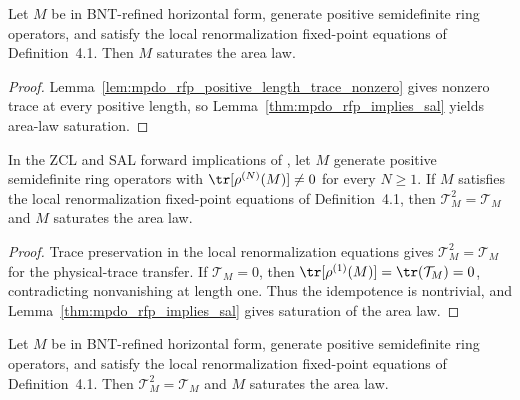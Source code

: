 \begin{corollary}
    \label{cor:mpdo_horizontal_rfp_implies_sal}
    \leanok
    Let $M$ be in BNT-refined horizontal form, generate positive
    semidefinite ring operators, and satisfy the local renormalization
    fixed-point equations of Definition~4.1. Then $M$ saturates the area law.
\end{corollary}

\begin{proof}\leanok
    Lemma~\ref{lem:mpdo_rfp_positive_length_trace_nonzero} gives nonzero trace
    at every positive length, so
    Lemma~\ref{thm:mpdo_rfp_implies_sal} yields area-law saturation.
\end{proof}

\begin{lemma}
    \label{thm:mpdo_rfp_implies_zcl_and_sal}
    \leanok
    In the ZCL and SAL forward implications of
    \cite[Appendix~C, lines~1333--1341]{Cirac2016MPDO_arXiv}, let $M$ generate
    positive semidefinite ring operators with $\tr[\rho^{(N)}(M)]\neq0$ for
    every $N\geq1$. If $M$ satisfies the local renormalization fixed-point
    equations of Definition~4.1, then $\mathcal T_M^2=\mathcal T_M$ and $M$
    saturates the area law.
\end{lemma}

\begin{proof}\leanok
    Trace preservation in the local renormalization equations gives
    $\mathcal T_M^2=\mathcal T_M$ for the physical-trace transfer. If
    $\mathcal T_M=0$, then
    $\tr[\rho^{(1)}(M)]=\tr(\mathcal T_M)=0$, contradicting nonvanishing at
    length one. Thus the idempotence is nontrivial, and
    Lemma~\ref{thm:mpdo_rfp_implies_sal} gives saturation of the area law.
\end{proof}

\begin{corollary}
    \label{cor:mpdo_horizontal_rfp_implies_zcl_and_sal}
    \leanok
    Let $M$ be in BNT-refined horizontal form, generate positive
    semidefinite ring operators, and satisfy the local renormalization
    fixed-point equations of Definition~4.1. Then
    $\mathcal T_M^2=\mathcal T_M$ and $M$ saturates the area law.
\end{corollary}

